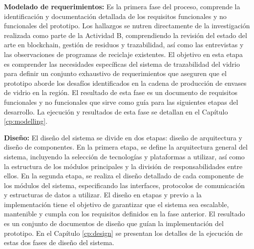 \textbf{Modelado de requerimientos:}
Es la primera fase del proceso, comprende la identificación y documentación detallada de los requisitos funcionales y no funcionales del prototipo.
Los hallazgos se nutren directamente de la investigación realizada como parte de la Actividad B, comprendiendo la revisión del estado del arte en blockchain, gestión de residuos y trazabilidad, así como las entrevistas y las observaciones de programas de reciclaje existentes.
El objetivo en esta etapa es comprender las necesidades específicas del sistema de trazabilidad del vidrio para definir un conjunto exhaustivo de requerimientos que aseguren que el prototipo aborde los desafíos identificados en la cadena de producción de envases de vidrio en la región.
El resultado de esta fase es un documento de requisitos funcionales y no funcionales que sirve como guía para las siguientes etapas del desarrollo.
La ejecución y resultados de esta fase se detallan en el Capítulo \ref{cp:modelling}.

\textbf{Diseño:}
El diseño del sistema se divide en dos etapas: diseño de arquitectura y diseño de componentes.
En la primera etapa, se define la arquitectura general del sistema, incluyendo la selección de tecnologías y plataformas a utilizar, así como la estructura de los módulos principales y la división de responsabilidades entre ellos.
En la segunda etapa, se realiza el diseño detallado de cada componente de los módulos del sistema, especificando las interfaces, protocolos de comunicación y estructuras de datos a utilizar.
El diseño en etapas y previo a la implementación tiene el objetivo de garantizar que el sistema sea escalable, mantenible y cumpla con los requisitos definidos en la fase anterior.
El resultado es un conjunto de documentos de diseño que guían la implementación del prototipo. En el Capítulo \ref{cp:design} se presentan los detalles de la ejecución de estas dos fases de diseño del sistema.

